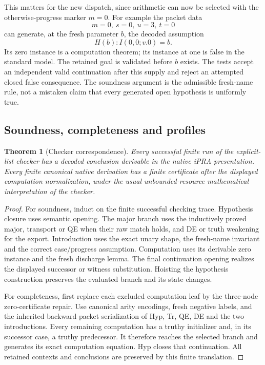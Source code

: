 \documentclass[11pt,letterpaper]{article}
\newtheorem{theorem}{Theorem}[section]
\theoremstyle{definition}\newtheorem{definition}[theorem]{Definition}
\theoremstyle{remark}\newtheorem{remark}[theorem]{Remark}
\begin{document}
This matters for the new dispatch, since arithmetic can now be selected
with the otherwise-progress marker $m=0$. For example the packet data
\[
                         m=0,\ s=0,\ u=3,\ t=0
\]
can generate, at the fresh parameter $b$, the decoded assumption
\[
                         H(b): I(0,0;v.0)=b.
\]
Its zero instance is a computation theorem; its instance at one is
false in the standard model. The retained goal is validated before
$b$ exists. The tests accept an independent valid continuation after
this supply and reject an attempted closed false consequence. The
soundness argument is the admissible fresh-name rule, not a mistaken
claim that every generated open hypothesis is uniformly true.

\subsection{Soundness, completeness and profiles}

\begin{theorem}[Checker correspondence]
Every successful finite run of the explicit-list checker has a decoded
conclusion derivable in the native iPRA presentation. Every finite
canonical native derivation has a finite certificate after the displayed
computation normalization, under the usual unbounded-resource
mathematical interpretation of the checker.
\end{theorem}
\begin{proof}
For soundness, induct on the finite successful checking trace.
Hypothesis closure uses semantic opening. The major branch uses the
inductively proved major, transport or QE when their raw match holds,
and DE or truth weakening for the export. Introduction uses the exact
unary shape, the fresh-name invariant and the correct case/progress
assumption. Computation uses its derivable zero instance and the fresh
discharge lemma. The final continuation opening realizes the displayed
successor or witness substitution. Hoisting the hypothesis construction
preserves the evaluated branch and its state changes.

For completeness, first replace each excluded computation leaf by the
three-node zero-certificate repair. Use canonical arity encodings,
fresh negative labels, and the inherited backward packet serialization
of Hyp, Tr, QE, DE and the two introductions. Every remaining computation
has a truthy initializer and, in its successor case, a truthy predecessor.
It therefore reaches the selected branch and generates its exact
computation equation. Hyp closes that continuation. All retained
contexts and conclusions are preserved by this finite translation.
\end{proof}
\end{document}
